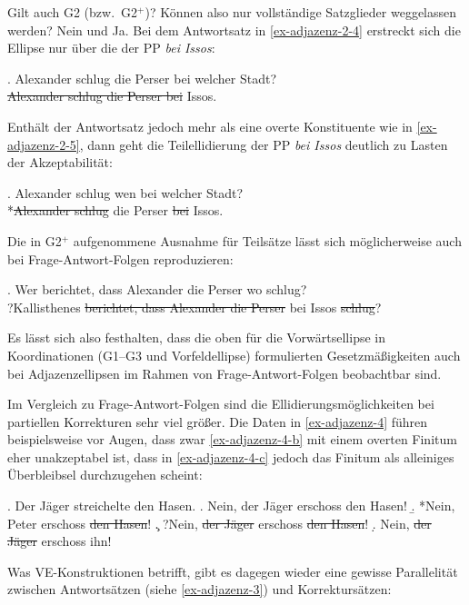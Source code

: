 Gilt auch G2 (bzw.\ G2$^+$)? Können also nur vollständige Satzglieder weggelassen werden? Nein und Ja. Bei dem Antwortsatz in \ref{ex-adjazenz-2-4} erstreckt sich die Ellipse nur über die  der PP {\it bei Issos}:  

\ex. \label{ex-adjazenz-2-4} Alexander schlug die Perser bei welcher Stadt? \\
 \sout{Alexander schlug die Perser bei} Issos.

Enthält der Antwortsatz jedoch mehr als eine overte Konstituente wie in \ref{ex-adjazenz-2-5}, dann geht die Teilellidierung der PP {\it bei Issos} deutlich zu Lasten der Akzeptabilität: 

\ex. Alexander schlug wen bei welcher Stadt?\label{ex-adjazenz-2-5}  \\
 *\sout{Alexander schlug} die Perser \sout{bei} Issos.
 
Die in G2$^+$ aufgenommene Ausnahme für Teilsätze lässt sich möglicherweise auch bei Frage-Antwort-Folgen reproduzieren:

\ex. \label{ex-adjazenz-2-9} Wer berichtet, dass Alexander die Perser wo schlug? \\
?Kallisthenes \sout{berichtet, dass Alexander die Perser} bei Issos \sout{schlug}?

Es lässt sich also festhalten, dass die oben für die Vorwärtsellipse in Koordinationen (G1--G3 und Vorfeldellipse)  formulierten Gesetzmä\ss igkeiten auch bei Adjazenzellipsen im Rahmen von Frage-Antwort-Folgen beobachtbar sind. %

Im Vergleich zu Frage-Antwort-Folgen sind die Ellidierungsmöglichkeiten bei partiellen Korrekturen sehr viel grö\ss er. Die Daten in \ref{ex-adjazenz-4} führen beispielsweise vor Augen, dass zwar \ref{ex-adjazenz-4-b} mit einem overten Finitum eher unakzeptabel ist, dass in \ref{ex-adjazenz-4-c} jedoch das Finitum als alleiniges Überbleibsel durchzugehen scheint:   

\ex. \label{ex-adjazenz-4}Der Jäger streichelte den Hasen.
\a. Nein, der Jäger erschoss den Hasen!
\b. *Nein, Peter erschoss \sout{den Hasen}!\label{ex-adjazenz-4-b}
\c. ?Nein, \sout{der Jäger} erschoss \sout{den Hasen}!\label{ex-adjazenz-4-c}
\d. Nein, \sout{der Jäger} erschoss ihn!

Was VE-Konstruktionen betrifft, gibt es dagegen wieder eine gewisse Parallelität zwischen Antwortsätzen (siehe \ref{ex-adjazenz-3}) und Korrektursätzen: 


